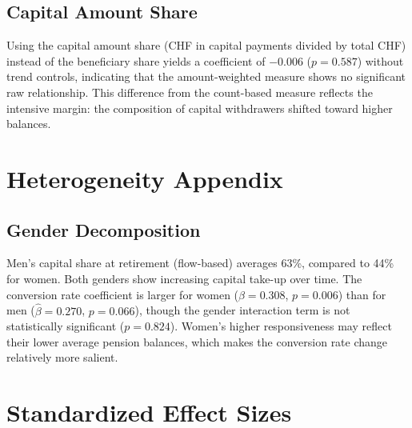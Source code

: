 \documentclass[12pt]{article}
\begin{document}
\subsection{Capital Amount Share}

Using the capital amount share (CHF in capital payments divided by total CHF) instead of the beneficiary share yields a coefficient of $-0.006$ ($p = 0.587$) without trend controls, indicating that the amount-weighted measure shows no significant raw relationship. This difference from the count-based measure reflects the intensive margin: the composition of capital withdrawers shifted toward higher balances.

\section{Heterogeneity Appendix}
\label{app:heterogeneity}

\subsection{Gender Decomposition}

Men's capital share at retirement (flow-based) averages 63\%, compared to 44\% for women. Both genders show increasing capital take-up over time. The conversion rate coefficient is larger for women ($\hat{\beta} = 0.308$, $p = 0.006$) than for men ($\hat{\beta} = 0.270$, $p = 0.066$), though the gender interaction term is not statistically significant ($p = 0.824$). Women's higher responsiveness may reflect their lower average pension balances, which makes the conversion rate change relatively more salient.

\section{Standardized Effect Sizes}
\label{sec:sde}


\end{document}

